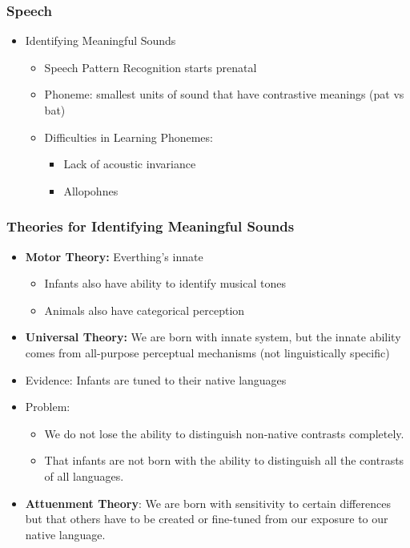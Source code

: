 \documentclass{beamer}
\begin{document}
\begin{frame}
\frametitle{Speech}
\begin{itemize}
    \item Identifying Meaningful Sounds
    \begin{itemize}
        \item Speech Pattern Recognition starts prenatal
        \item Phoneme: smallest units of sound that have contrastive meanings (pat vs bat)
        \item Difficulties in Learning Phonemes:
        \pause
        \begin{itemize}
            \item Lack of acoustic invariance
            \item Allopohnes
        \end{itemize}
    \end{itemize}
\end{itemize}
\end{frame}
\begin{frame}
\frametitle{Theories for Identifying Meaningful Sounds}
\begin{itemize}
\item \textbf{Motor Theory:} 
\pause Everthing's innate
\begin{itemize}
    \item Infants also have ability to identify musical tones
    \item Animals also have categorical perception
\end{itemize}
\pause
\item \textbf{Universal Theory:}
\pause We are born with innate system,  but the innate ability comes from all-purpose perceptual mechanisms (not linguistically specific) 
\item Evidence: Infants are tuned to their native languages
\pause 
\item Problem:
\begin{itemize}
    \item We do not lose the ability to distinguish non-native contrasts completely.
    \item That infants are not born with the ability to distinguish all the contrasts of all languages.
\end{itemize}
\item \textbf{Attuenment Theory}:
\pause
We are born with sensitivity to certain differences but that others have to be created or fine-tuned from our exposure to our native language.
\end{itemize}
\end{frame}
\end{document}
